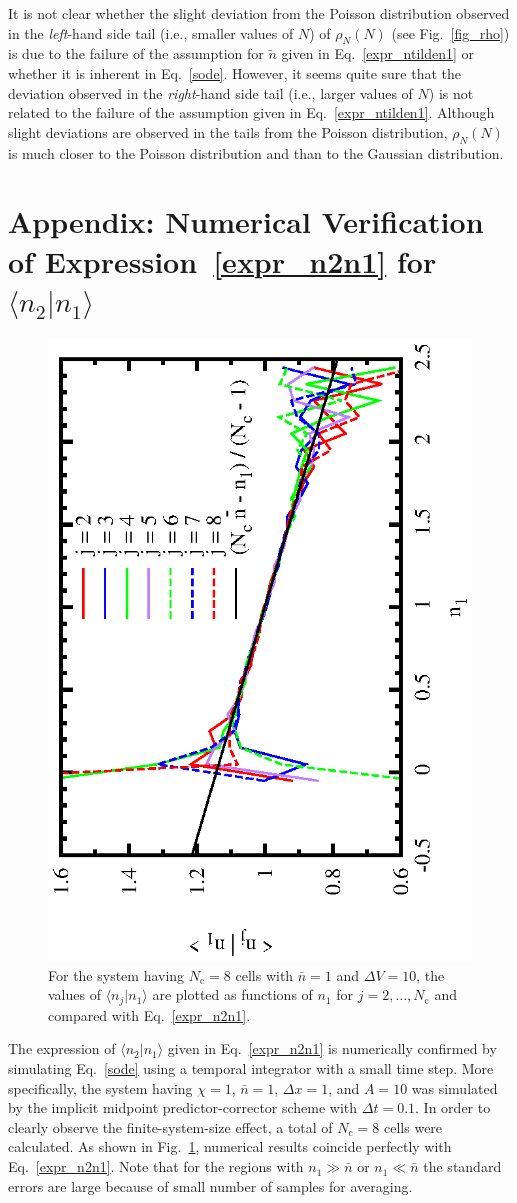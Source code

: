 \documentclass{article}
\newcommand{\dx}{{\Delta x}}
\newcommand{\dV}{{\Delta V}}
\newcommand{\dt}{{\Delta t}}
\newcommand{\Nc}{{N_\mathrm{c}}}
\newcommand{\nb}{\bar{n}}
\begin{document}
It is not clear whether the slight deviation from the Poisson distribution observed in the \textit{left}-hand side tail (i.e., smaller values of $N$) of $\rho_N(N)$ (see Fig.~\ref{fig_rho}) is due to the failure of the assumption for $\tilde{n}$ given in Eq.~\eqref{expr_ntilden1} or whether it is inherent in Eq.~\eqref{sode}.
However, it seems quite sure that the deviation observed in the \textit{right}-hand side tail (i.e., larger values of $N$) is not related to the failure of the assumption given in Eq.~\eqref{expr_ntilden1}.
Although slight deviations are observed in the tails from the Poisson distribution, $\rho_N(N)$ is much closer to the Poisson distribution and than to the Gaussian distribution.

\clearpage

\section*{Appendix: Numerical Verification of Expression~\eqref{expr_n2n1} for $\langle n_2|n_1\rangle$}

\begin{figure}
\begin{center}
\includegraphics[angle=270,width=0.4\linewidth]{fig4/cond_exp.eps}
\caption{\label{fig_condexp}For the system having $\Nc=8$ cells with $\nb=1$ and $\dV=10$, the values of $\langle n_j|n_1\rangle$ are plotted as functions of $n_1$ for $j=2,\dots,\Nc$ and compared with Eq.~\eqref{expr_n2n1}.}
\end{center}
\end{figure}

The expression of $\langle n_2|n_1\rangle$ given in Eq.~\eqref{expr_n2n1} is numerically confirmed by simulating Eq.~\eqref{sode} using a temporal integrator with a small time step.
More specifically, the system having $\chi=1$, $\nb=1$, $\dx=1$, and $A=10$ was simulated by the implicit midpoint predictor-corrector scheme with $\dt=0.1$.
In order to clearly observe the finite-system-size effect, a total of $\Nc=8$ cells were calculated.
As shown in Fig.~\ref{fig_condexp}, numerical results coincide perfectly with Eq.~\eqref{expr_n2n1}.
Note that for the regions with $n_1\gg\nb$ or $n_1\ll\nb$ the standard errors are large because of small number of samples for averaging.
\end{document}
